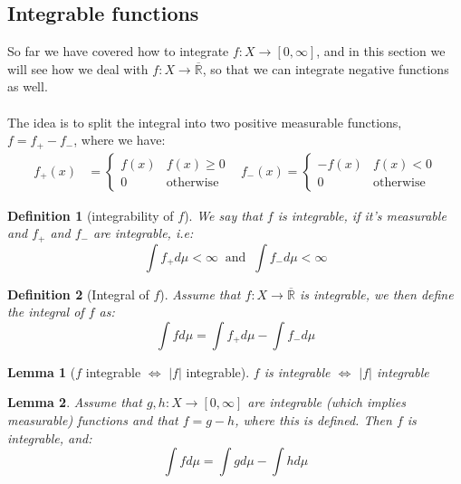 \documentclass{article}
\newcommand{\Rbar}{\overline{\mathbb{R}}}%
\newtheorem{definition}{Definition}
\newtheorem{lemma}{Lemma}
\begin{document}
\subsection{Integrable functions}
So far we have covered how to integrate $f:X\to [0,\infty]$, and in this section we will see how we deal with $f:X\to \Rbar$, so that we can integrate negative functions as well. 
\\~\\ 
The idea is to split the integral into two positive measurable functions,\\ 
$f = f_{+} - f_{-}$, where we have: 
\begin{align*}
f_{+}(x) &= \begin{cases}
      f(x) & \text{$f(x) \geq 0$}\\
      0 & \text{otherwise}
    \end{cases} 
\;\;\;    
f_{-}(x) = \begin{cases}
      -f(x) & \text{$f(x) < 0$}\\
      0 & \text{otherwise}
    \end{cases}   
\end{align*}

\begin{definition}[integrability of $f$]
We say that $f$ is integrable, if it's measurable and $f_{+}$ and $f_{-}$ are integrable, i.e: 
\[\int f_{+}d\mu < \infty\;\; \text{and}\;\; \int f_{-}d\mu < \infty
\]
\end{definition}

\begin{definition}[Integral of $f$]
Assume that $f:X\to \Rbar$ is integrable, we then define the integral of $f$ as:
\[\int fd\mu = \int f_{+}d\mu - \int f_{-}d\mu
\]
\end{definition}

\begin{lemma}[$f$ integrable $\iff$ $|f|$ integrable]
$f$ is integrable $\iff$ $|f|$ integrable
\end{lemma}


\begin{lemma}
Assume that $g,h:X\to [0, \infty]$ are integrable (which implies measurable) functions and that $f = g-h$, where this is defined. Then $f$ is integrable, and: 
\[\int fd\mu = \int gd\mu - \int hd\mu
\]
\end{lemma}
\end{document}

